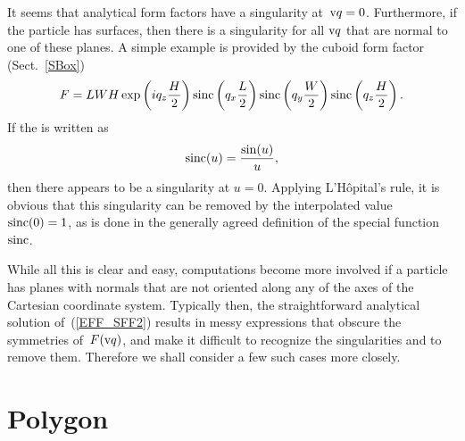 %
It seems that  analytical form factors have a singularity at~$\text{v}{q}=0$.
Furthermore, if the particle has  surfaces,
then there is a singularity for all $\text{v}{q}$ that are normal to one of these planes.
A simple example is provided by the cuboid form factor (Sect.~\ref{SBox})
\begin{equation}
F= L W H\exp\left(i q_z \frac{H}{2}\right) \operatorname{sinc}\left(q_x \frac{L}{2}\right)
\operatorname{sinc}\left(q_y \frac{W}{2}\right) \operatorname{sinc}\left(q_z \frac{H}{2}\right).
\end{equation}
If the  is written as
\begin{equation}
  \operatorname{sinc}(u) = \frac{\sin(u)}{u},
\end{equation}
then there appears to be a singularity at $u=0$.
Applying L'Hôpital's rule, it is obvious
that this singularity can be removed by the interpolated value
$\operatorname{sinc}(0)=1$,
as is done in the generally agreed definition of the special function~$\operatorname{sinc}$.

While all this is clear and easy,
computations become more involved
if a particle has planes with normals that are not oriented along
any of the axes of the Cartesian coordinate system.
Typically then, the straightforward analytical solution of~(\ref{EFF_SFF2})
results in messy expressions that obscure the symmetries of~$F(\text{v}{q})$,
and make it difficult to recognize the singularities and
to remove them.
Therefore we shall consider a few such cases more closely.


\section{Polygon}

\def\R{\v{R}}
\def\E{\v{E}}

